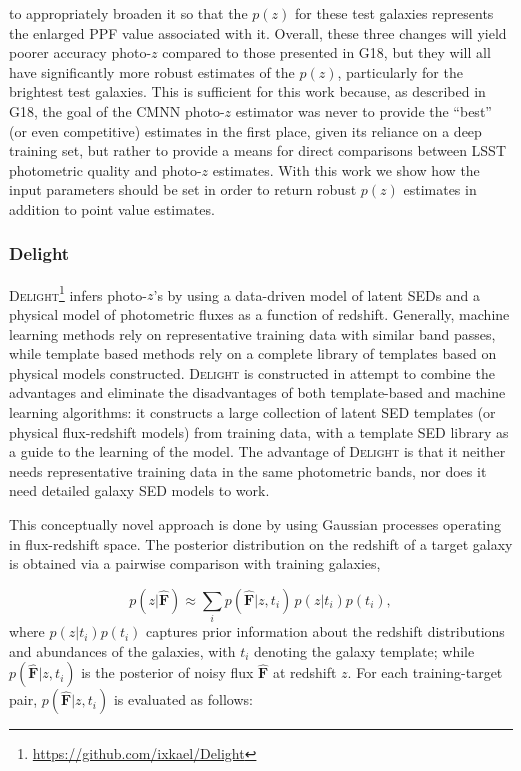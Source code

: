 \noindent to appropriately broaden it so that the $p(z)$ for these test galaxies represents the enlarged PPF value associated with it. Overall, these three changes will yield poorer accuracy photo-$z$ compared to those presented in G18, but they will all have significantly more robust estimates of the $p(z)$, particularly for the brightest test galaxies. This is sufficient for this work because, as described in G18, the goal of the \textsc{CMNN} photo-$z$ estimator was never to provide the ``best'' (or even competitive) estimates in the first place, given its reliance on a deep training set, but rather to provide a means for direct comparisons between LSST photometric quality and photo-$z$ estimates. With this work we show how the input parameters should be set in order to return robust $p(z)$ estimates in addition to point value estimates.


\subsubsection{Delight}
\label{sec:delight}

\textsc{Delight}\footnote{\url{https://github.com/ixkael/Delight}} \citep{Leistedt:17} infers photo-$z$'s by using a data-driven model of latent SEDs and a physical model of photometric fluxes as a function of redshift. Generally, machine learning methods rely on representative training data with similar band passes, while template based methods rely on a complete library of templates based on physical models constructed. \textsc{Delight} is constructed in attempt to combine the advantages and eliminate the disadvantages of both template-based and machine learning algorithms: it constructs a large collection of latent SED templates (or physical flux-redshift models) from training data, with a template SED library as a guide to the learning of the model. The advantage of \textsc{Delight} is that it neither needs representative training data in the same photometric bands, nor does it need detailed galaxy SED models to work.

This conceptually novel approach is done by using Gaussian processes operating in flux-redshift space. The posterior distribution on the redshift of a target galaxy is obtained via a pairwise comparison with training galaxies,

\begin{equation}
p(z|\mathbf{\hat{F}}) \approx \sum_i p(\mathbf{\hat{F}}|z,t_i)\, p(z|t_i)p(t_i),
\end{equation}
\noindent where $p(z|t_i)p(t_i)$ captures prior information about the redshift distributions and abundances of the galaxies, with $t_i$ denoting the galaxy template; while $p(\mathbf{\hat{F}}|z,t_i)$ is the posterior of noisy flux $\mathbf{\hat{F}}$ at redshift $z$. For each training-target pair, $p(\mathbf{\hat{F}}|z,t_i)$ is evaluated as follows:

